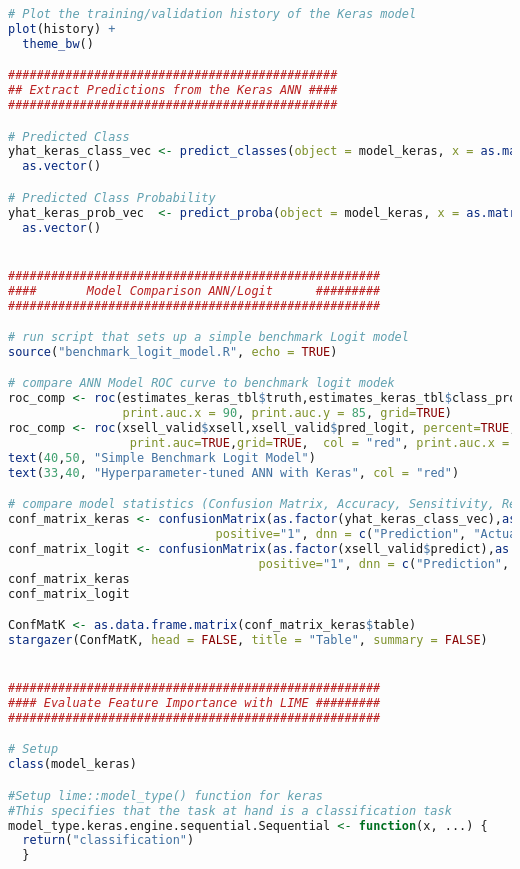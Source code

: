 \begin{lstlisting}[language=R,caption={Main analysis}, label=lst_main]
# Plot the training/validation history of the Keras model
plot(history) +
  theme_bw()

##############################################
## Extract Predictions from the Keras ANN ####
##############################################

# Predicted Class
yhat_keras_class_vec <- predict_classes(object = model_keras, x = as.matrix(x_test_tbl)) %>%
  as.vector()

# Predicted Class Probability
yhat_keras_prob_vec  <- predict_proba(object = model_keras, x = as.matrix(x_test_tbl)) %>%
  as.vector()


####################################################
####       Model Comparison ANN/Logit      #########
####################################################

# run script that sets up a simple benchmark Logit model
source("benchmark_logit_model.R", echo = TRUE)

# compare ANN Model ROC curve to benchmark logit modek
roc_comp <- roc(estimates_keras_tbl$truth,estimates_keras_tbl$class_prob, percent=TRUE, plot=TRUE, print.auc=TRUE,
                print.auc.x = 90, print.auc.y = 85, grid=TRUE)
roc_comp <- roc(xsell_valid$xsell,xsell_valid$pred_logit, percent=TRUE, plot=TRUE,
                 print.auc=TRUE,grid=TRUE,  col = "red", print.auc.x = 90, print.auc.y = 75, add = TRUE)
text(40,50, "Simple Benchmark Logit Model")
text(33,40, "Hyperparameter-tuned ANN with Keras", col = "red")

# compare model statistics (Confusion Matrix, Accuracy, Sensitivity, Recall, etc.)
conf_matrix_keras <- confusionMatrix(as.factor(yhat_keras_class_vec),as.factor(estimates_keras_tbl$truth), 
                             positive="1", dnn = c("Prediction", "Actual"))
conf_matrix_logit <- confusionMatrix(as.factor(xsell_valid$predict),as.factor(xsell_valid$xsell), 
                                   positive="1", dnn = c("Prediction", "Actual"))
conf_matrix_keras
conf_matrix_logit

ConfMatK <- as.data.frame.matrix(conf_matrix_keras$table)
stargazer(ConfMatK, head = FALSE, title = "Table", summary = FALSE)


####################################################
#### Evaluate Feature Importance with LIME #########
####################################################

# Setup
class(model_keras)

#Setup lime::model_type() function for keras
#This specifies that the task at hand is a classification task
model_type.keras.engine.sequential.Sequential <- function(x, ...) {
  return("classification")
  }



\end{lstlisting}
